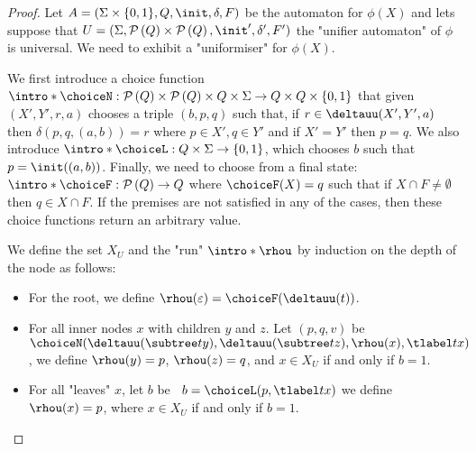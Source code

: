 \documentclass{article}
\begin{document}
\begin{proof}
	Let $A =  (\Sigma \times \{0,1\}, Q, \init, \delta, F)$ be the automaton for $\phi(X)$ and lets suppose that
	$U = (\Sigma, \parts Q \times \parts Q,\init', \delta', F')$ the "unifier automaton" of $\phi$ is universal.
	We need to exhibit a "uniformiser" for $\phi(X)$.

	We first introduce a choice function $\intro*\choiceN : \parts Q \times \parts Q \times Q \times \Sigma \to Q \times Q \times \set{0,1}$
	that given $(X',Y',r,a)$ chooses a triple $(b,p,q)$ such that, if $r \in \deltauu(X',Y', a)$ then $\delta(p,q,(a,b)) = r$ where $p \in X', q \in Y'$
	and if $X' = Y'$ then $p = q$.
	We also introduce $\intro* \choiceL : Q \times \Sigma \to \set{0,1} $, which chooses
	$b$ such that $p = \init((a,b))$.
	Finally, we need to choose from a final state: $\intro* \choiceF : \parts Q \to  Q$ where
	$\choiceF (X) = q$ such that if $X \cap F \neq \emptyset$ then $q \in X \cap F$. If the premises are not satisfied in any of the cases, then
	these choice functions return an arbitrary value.

	We define the set $X_U$ and the "run" $\intro*\rhou$  by induction on the depth of the node as follows:
	\begin{itemize}
		\item For the root, we define $\rhou(\varepsilon) = \choiceF(\deltauu(t))$.
		\item For all inner nodes $x$ with children $y$ and $z$. Let $(p,q,v)$ be~$\choiceN(\deltauu(\subtree t y), \deltauu(\subtree t z), \rhou(x), \tlabel t x)$, we define
		      $\rhou(y)=p$, $\rhou(z)=q$, and $x \in X_U$ if and only if $b = 1$.
		\item For all "leaves" $x$, let $b$ be ~$b = \choiceL(p, \tlabel t x)$ we define $\rhou (x) = p$, where $x \in X_U$ if and only if $b = 1$.
	\end{itemize}


\end{proof}
\end{document}
